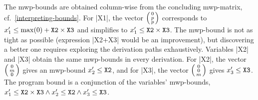 \begin{example}
The mwp-bounds are obtained column-wise from the concluding mwp-matrix, cf.~\autoref{interpreting-bounds}.
For \pr|X1|, the vector \(\left(\begin{smallmatrix}0\\p\\p\end{smallmatrix}\right)\)
corresponds to \(x_1' \leq \max(0) + \prm{X2}\times\prm{X3}\) and simplifies to \(x_1' \leq\prm{X2}\times\prm{X3}\).
The mwp-bound is not as tight as possible (expression \pr|X2+X3| would be an improvement),
but discovering a better one requires exploring the derivation paths exhaustively.
Variables \pr|X2| and \pr|X3| obtain the same mwp-bounds in every derivation.
For \pr|X2|, the vector \(\left(\begin{smallmatrix}0\\m\\0\end{smallmatrix}\right)\) gives an mwp-bound \(x_2' \leq\prm{X2}\),
and for \pr|X3|, the vector \(\left(\begin{smallmatrix}0\\0\\m\end{smallmatrix}\right)\) gives \(x_3' \leq\prm{X3}\).
The program bound is a conjunction of the variables' mwp-bounds, \ie
\(x_1'\leq\prm{X2}\times\prm{X3} \land x_2' \leq\prm{X2} \land x_3' \leq\prm{X3}\).
\end{example}

